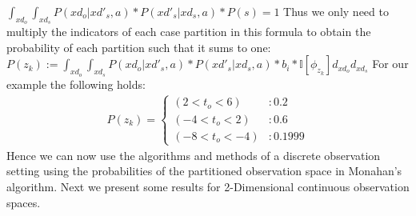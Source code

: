 \documentclass{article} %
\begin{document}
$\int_{xd_o}\int_{xd_s} P(xd_o|xd'_s,a)*P(xd'_s|xd_s,a)*P(s) = 1$
Thus we only need to multiply the indicators of each case partition in this formula to obtain the probability of each partition such that it sums to one: 
$P(z_k) := \int_{xd_o}\int_{xd_s} P(xd_o|xd'_s,a)*P(xd'_s|xd_s,a)*b_i* \mathbb{I}[\phi_{z_k}] d_{xd_o} d_{xd_s}$
For our example the following holds: 
{\footnotesize
\begin{align}
P(z_k)=
\begin{cases}
 (2<t_o<6) &: 0.2 \\
(-4<t_o<2) &: 0.6\\
(-8<t_o<-4) &:0.1999
\end{cases} 
\nonumber
\end{align}
}
Hence we can now use the algorithms and methods of a discrete observation setting using the probabilities of the partitioned observation space in Monahan's algorithm. 
Next we present some results for 2-Dimensional continuous observation spaces.

\end{document}
